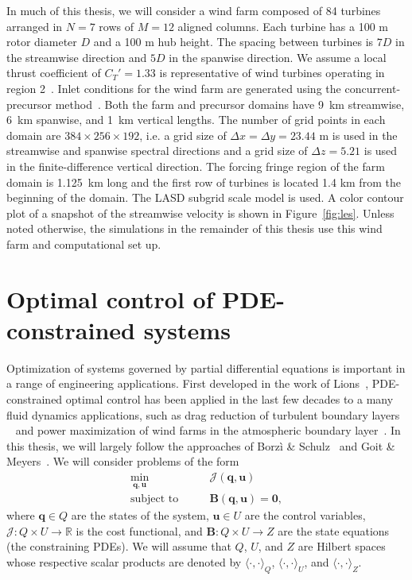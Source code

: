 In much of this thesis, we will consider a wind farm composed of 84 turbines arranged in $N=7$ rows of $M=12$ aligned columns. Each turbine has a 100 m rotor diameter $D$ and a 100 m hub height. The spacing between turbines is $7D$ in the streamwise direction and $5D$ in the spanwise direction. We assume a  local thrust coefficient of $C_T'= 1.33$ is representative of wind turbines operating in region 2~\cite{Calaf2010a, Stevens2014c}. Inlet conditions for the wind farm are generated using the concurrent-precursor method~\cite{Stevens2014a}. Both the farm and precursor domains have 9~km streamwise, 6~km spanwise, and 1~km vertical lengths. The number of grid points in each domain are $384 \times 256 \times 192$, i.e. a grid size of $\Delta x = \Delta y = 23.44$ m is used in the streamwise and spanwise spectral directions and a grid size of $\Delta z = 5.21$ is used in the finite-difference vertical direction. The forcing fringe region of the farm domain is 1.125~km long and the first row of turbines is located 1.4 km from the beginning of the domain. The LASD subgrid scale model is used. A color contour plot of a snapshot of the streamwise velocity is shown in Figure~\ref{fig:les}. Unless noted otherwise, the simulations in the remainder of this thesis use this wind farm and computational set up.


\section{Optimal control of PDE-constrained systems}
\label{sec:methods-pdeopt}
Optimization of systems governed by partial differential equations is important in a range of engineering applications. First developed in the work of Lions~\cite{Lions1971a}, PDE-constrained optimal control has been applied in the last few decades to a many fluid dynamics applications, such as drag reduction of turbulent boundary layers ~\cite{Bewley2001a} and power maximization of wind farms in the atmospheric boundary layer~\cite{Goit2015a}. In this thesis, we will largely follow the approaches of Borz\`{i} \& Schulz~\cite{Borzi2011a} and Goit \& Meyers~\cite{Goit2015a}. We will consider problems of the form
\begin{align}
\label{eq:pde_constrained1}
\underset{\mathbf{q}, \mathbf{u}}{\textrm{min}} &\qquad \mathcal{J}(\mathbf{q},\mathbf{u}) \\
\label{eq:pde_constrained2}
\text{subject to} &\qquad \mathbf{B}(\mathbf{q}, \mathbf{u}) = \mathbf{0},
\end{align}
where $\mathbf{q} \in Q$ are the states of the system, $\mathbf{u} \in U$ are the control variables, $\mathcal{J}:Q\times U \rightarrow \mathbb{R}$ is the cost functional, and $\mathbf{B}:Q \times U \rightarrow Z$ are the state equations (the constraining PDEs). We will assume that $Q$, $U$, and $Z$ are Hilbert spaces whose respective scalar products are denoted by $\langle \cdot, \cdot \rangle_Q$, $\langle \cdot, \cdot \rangle_U$, and $\langle \cdot, \cdot \rangle_Z$.

